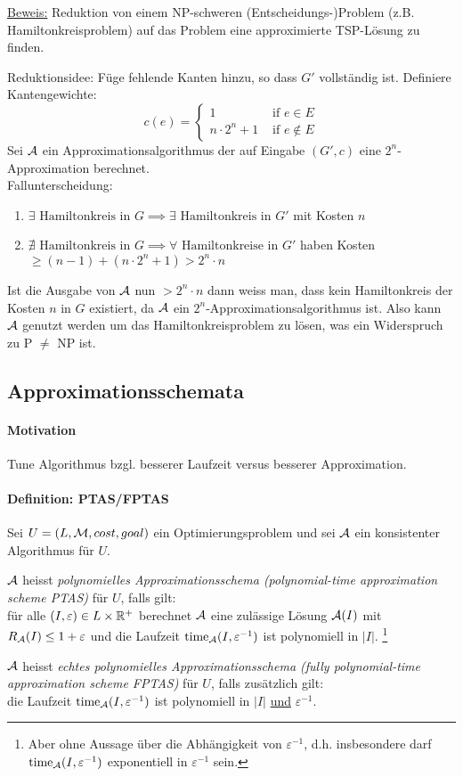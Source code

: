 \underline{Beweis:}
Reduktion von einem NP-schweren (Entscheidungs-)Problem (z.B. Hamiltonkreisproblem) auf das Problem eine
approximierte TSP-Lösung zu finden.

Reduktionsidee: Füge fehlende Kanten hinzu, so dass $G'$ vollständig ist.
Definiere Kantengewichte:
$$ c(e) = \begin{cases}
1 & \text{ if } e \in E \\
n \cdot 2^n + 1 & \text{ if } e \notin E
\end{cases} $$
Sei $\mathcal{A}$ ein Approximationsalgorithmus der auf Eingabe $(G', c)$ eine $2^n$-Approximation berechnet.
\\
Fallunterscheidung:
\begin{enumerate}
    \item $\exists \text{ Hamiltonkreis in } G \implies \exists \text{ Hamiltonkreis in } G' $ mit Kosten $n$
    \item $\nexists \text{ Hamiltonkreis in } G \implies \forall \text{ Hamiltonkreise in } G' $ haben Kosten
    $\geq (n-1) + (n \cdot 2^n + 1) > 2^n \cdot n $
\end{enumerate}
Ist die Ausgabe von $\mathcal{A}$ nun $> 2^n \cdot n$ dann weiss man, dass kein Hamiltonkreis der Kosten $n$ in $G$ existiert,
da $\mathcal{A}$ ein $2^n$-Approximationsalgorithmus ist.
Also kann $\mathcal{A}$ genutzt werden um das Hamiltonkreisproblem zu lösen, was ein Widerspruch zu P $\neq$ NP ist.


\subsection{Approximationsschemata}

\paragraph{Motivation}
Tune Algorithmus bzgl. besserer Laufzeit versus besserer Approximation.

\paragraph{Definition: PTAS/FPTAS}
{
\newcommand{\eps}{\varepsilon^{-1}}
Sei $U = (L, \mathcal{M}, cost, goal)$ ein Optimierungsproblem und sei $\mathcal{A}$ ein konsistenter Algorithmus für $U$.

$\mathcal{A}$ heisst \emph{polynomielles Approximationsschema (polynomial-time approximation scheme PTAS)}
für $U$, falls gilt: \\
für alle $(I,\varepsilon) \in L \times \mathbb{R}^+$ berechnet $\mathcal{A}$ eine zulässige Lösung $\mathcal{A}(I)$ mit
$R_{\mathcal{A}}(I) \leq 1+\varepsilon$ und die Laufzeit $\Time_\A(I, \eps)$ ist polynomiell in $|I|$.%
\footnote{Aber ohne Aussage über die Abhängigkeit von $\eps$, d.h. insbesondere darf $\Time_\A(I, \eps)$
exponentiell in $\eps$ sein.}

$\mathcal{A}$ heisst \emph{echtes polynomielles Approximationsschema (fully polynomial-time approximation scheme FPTAS)}
für $U$, falls zusätzlich gilt: \\
die Laufzeit $\Time_\A(I, \eps)$ ist polynomiell in $|I|$ \underline{und} $\eps$.
}

